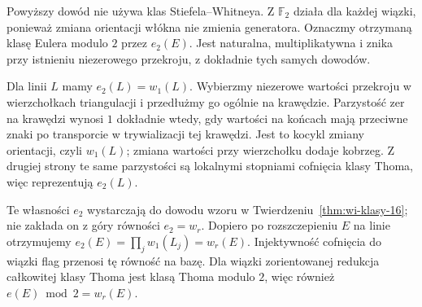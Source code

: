 \begin{uwaga}
Powyższy dowód nie używa klas Stiefela--Whitneya.
Z $\mathbb F_2$ działa dla każdej wiązki, ponieważ
zmiana orientacji włókna nie zmienia generatora.
Oznaczmy otrzymaną klasę Eulera modulo $2$ przez $e_2(E)$.
Jest naturalna, multiplikatywna i znika przy istnieniu
niezerowego przekroju, z dokładnie tych samych dowodów.

Dla linii $L$ mamy $e_2(L)=w_1(L)$. Wybierzmy
niezerowe wartości przekroju w wierzchołkach triangulacji
i przedłużmy go ogólnie na krawędzie. Parzystość zer
na krawędzi wynosi $1$ dokładnie wtedy, gdy wartości
na końcach mają przeciwne znaki po transporcie
w trywializacji tej krawędzi. Jest to kocykl zmiany
orientacji, czyli $w_1(L)$; zmiana wartości przy
wierzchołku dodaje kobrzeg. Z drugiej strony te same
parzystości są lokalnymi stopniami cofnięcia klasy Thoma,
więc reprezentują $e_2(L)$.

Te własności $e_2$ wystarczają do dowodu wzoru
w Twierdzeniu~\ref{thm:wi-klasy-16}; nie zakłada on
z góry równości $e_2=w_r$. Dopiero po rozszczepieniu
$E$ na linie otrzymujemy
$e_2(E)=\prod_jw_1(L_j)=w_r(E)$.
Injektywność cofnięcia do wiązki flag przenosi
tę równość na bazę. Dla wiązki zorientowanej
redukcja całkowitej klasy Thoma jest klasą Thoma modulo $2$,
więc również $e(E)\bmod2=w_r(E)$.
\end{uwaga}


